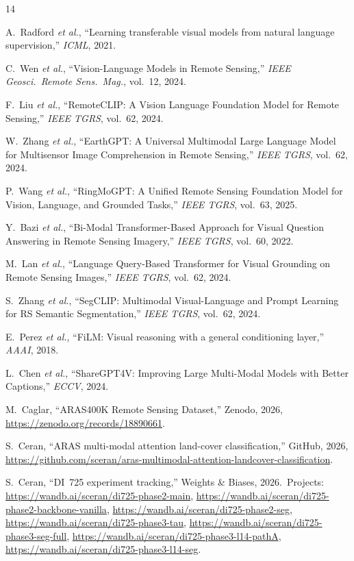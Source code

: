 \documentclass[conference]{IEEEtran}
\begin{document}
\scriptsize
\setlength{\IEEEilabelindent}{0pt}
\setlength{\IEEEiednormlabelsep}{0pt}
\renewcommand{\IEEEbibitemsep}{0pt plus 0.3pt}
\begin{thebibliography}{14}

A.~Radford \emph{et al.}, ``Learning transferable visual models from natural language supervision,'' \emph{ICML}, 2021.

C.~Wen \emph{et al.}, ``Vision-Language Models in Remote Sensing,'' \emph{IEEE Geosci.\ Remote Sens.\ Mag.}, vol.~12, 2024.

F.~Liu \emph{et al.}, ``RemoteCLIP: A Vision Language Foundation Model for Remote Sensing,'' \emph{IEEE TGRS}, vol.~62, 2024.

W.~Zhang \emph{et al.}, ``EarthGPT: A Universal Multimodal Large Language Model for Multisensor Image Comprehension in Remote Sensing,'' \emph{IEEE TGRS}, vol.~62, 2024.

P.~Wang \emph{et al.}, ``RingMoGPT: A Unified Remote Sensing Foundation Model for Vision, Language, and Grounded Tasks,'' \emph{IEEE TGRS}, vol.~63, 2025.

Y.~Bazi \emph{et al.}, ``Bi-Modal Transformer-Based Approach for Visual Question Answering in Remote Sensing Imagery,'' \emph{IEEE TGRS}, vol.~60, 2022.

M.~Lan \emph{et al.}, ``Language Query-Based Transformer for Visual Grounding on Remote Sensing Images,'' \emph{IEEE TGRS}, vol.~62, 2024.

S.~Zhang \emph{et al.}, ``SegCLIP: Multimodal Visual-Language and Prompt Learning for RS Semantic Segmentation,'' \emph{IEEE TGRS}, vol.~62, 2024.

E.~Perez \emph{et al.}, ``FiLM: Visual reasoning with a general conditioning layer,'' \emph{AAAI}, 2018.

L.~Chen \emph{et al.}, ``ShareGPT4V: Improving Large Multi-Modal Models with Better Captions,'' \emph{ECCV}, 2024.

M.~Caglar, ``ARAS400K Remote Sensing Dataset,'' Zenodo, 2026, \url{https://zenodo.org/records/18890661}.

S.~Ceran, ``ARAS multi-modal attention land-cover classification,'' GitHub, 2026, \url{https://github.com/sceran/aras-multimodal-attention-landcover-classification}.

S.~Ceran, ``DI~725 experiment tracking,'' Weights \& Biases, 2026.\ Projects: \url{https://wandb.ai/sceran/di725-phase2-main}, \url{https://wandb.ai/sceran/di725-phase2-backbone-vanilla}, \url{https://wandb.ai/sceran/di725-phase2-seg}, \url{https://wandb.ai/sceran/di725-phase3-tau}, \url{https://wandb.ai/sceran/di725-phase3-seg-full}, \url{https://wandb.ai/sceran/di725-phase3-l14-pathA}, \url{https://wandb.ai/sceran/di725-phase3-l14-seg}.

\end{thebibliography}
\end{document}

